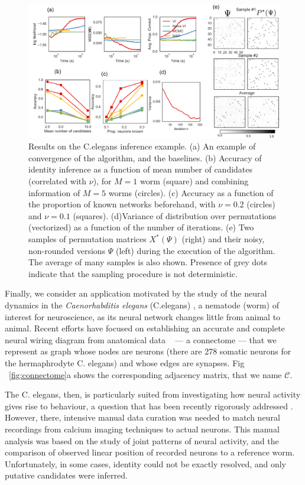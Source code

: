 \documentclass[twoside]{article}
\begin{document}
\begin{figure}[ht]
  \centering
  \includegraphics[width=1.0\textwidth]{../figures/figure7.pdf} 
  \caption{Results on the C.elegans inference example. (a) An example of convergence of the algorithm, and the baselines. (b) Accuracy of identity inference as a function of mean number of candidates (correlated with $\nu$), for $M=1$ worm (square) and combining information of $M=5$ worms (circles). (c) Accuracy as a function of the proportion of known networks beforehand,  with $\nu=0.2$ (circles) and $\nu=0.1$ (squares). (d)Variance of distribution over permutations (vectorized) as a function of the number of iterations. (e) Two samples of permutation matrices $X^*(\Psi)$ (right) and their noisy, non-rounded versions $\Psi$ (left) during the execution of the algorithm. The average of many samples is also shown. Presence of grey dots indicate that the sampling procedure is not deterministic.}
\label{fig:elegantresults}
\end{figure}


Finally, we consider an application motivated by the study of the neural dynamics in the \textit{Caenorhabditis elegans} (C.elegans)  \cite{Kato2015}, a nematode (worm) of interest for neuroscience, as its neural network changes little from animal to animal. Recent efforts have focused on establishing an accurate and complete neural wiring diagram from anatomical data ~\citep{varshney2011structural} --- a connectome --- that we represent as graph whose nodes are neurons (there are 278 somatic neurons for the hermaphrodyte C. elegans) and whose edges are synapses. Fig ~\ref{fig:connectome}a shows the corresponding adjacency matrix, that we name $\mathcal{C}$.

The C. elegans, then, is particularly suited from investigating how neural activity gives rise to behaviour, a question that has been recently rigorously addressed \cite{Kato2015}. However, there, intensive manual data curation was needed to match neural recordings from calcium imaging techniques to actual neurons. This manual analysis was based on the study of joint patterns of neural activity, and the comparison of observed linear position of recorded neurons to a reference worm. Unfortunately, in some cases, identity could not be exactly resolved, and only putative candidates were inferred. 
\end{document}

